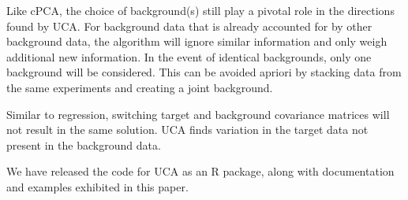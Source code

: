 \documentclass[12pt]{article}
\begin{document}
Like cPCA, the choice of background(s) still play a pivotal role in the directions found by UCA.
For background data that is already accounted for by other background data, the algorithm will ignore similar information and only weigh additional new information. In the event of identical backgrounds, only one background will be considered.
This can be avoided apriori by stacking data from the same experiments and creating a joint background. 

Similar to regression, switching target and background covariance matrices will not result in the same solution.
UCA finds variation in the target data not present in the background data.


We have released the code for UCA as an R package, along with documentation and examples exhibited in this paper. 

%
% 
% 
\end{document}
